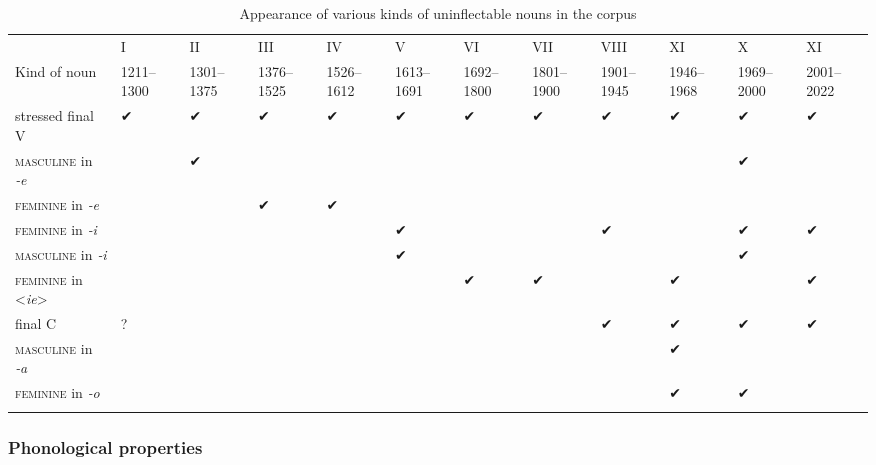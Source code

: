 \documentclass[output=paper,colorlinks,citecolor=brown]{langscibook}
\begin{document}
\begin{table}
	\centering
	\begin{tabularx}{\textwidth}{p{2.7cm}XXXXXXXXXXX}
		\lsptoprule
			\multicolumn{1}{r}{Time period} & I & II & III & IV & V & VI & VII & VIII & XI & X & XI \\
			\multicolumn{1}{l}{Kind of noun} & 1211–1300 & 1301–1375 & 1376–1525 & 1526–1612 & 1613–1691 & 1692–1800 & 1801–1900 & 1901–1945 & 1946–1968 & 1969–2000 & 2001–2022 \\
			\midrule
			stressed final V & ✔ & ✔ & ✔ & ✔ & ✔ & ✔ & ✔ & ✔ & ✔ & ✔ & ✔ \\
			\textsc{masculine} in \emph{‑e} & & ✔ & & & & & & & & ✔ & \\
			\textsc{feminine} in \emph{‑e} & & & ✔ & ✔ & & & & & & & \\
			\textsc{feminine} in \emph{‑i} & \cellcolor{gray!75} & \cellcolor{gray!75} & \cellcolor{gray!75} & \cellcolor{gray!75} & ✔ & & & ✔ & & ✔ & ✔ \\
			\textsc{masculine} in \emph{‑i} & \cellcolor{gray!75} & \cellcolor{gray!75} & \cellcolor{gray!75} & \cellcolor{gray!75} & ✔ & & & & & ✔ & \\
			\textsc{feminine} in <\emph{ie}> & \cellcolor{gray!75} & \cellcolor{gray!75} & \cellcolor{gray!75} & \cellcolor{gray!75} & \cellcolor{gray!75} & ✔ & ✔ & & ✔ & & ✔ \\
			final C & ? & \cellcolor{gray!50} & \cellcolor{gray!50} & \cellcolor{gray!50} & \cellcolor{gray!50} & \cellcolor{gray!50} & \cellcolor{gray!50} & ✔ & ✔ & ✔ & ✔ \\
			\textsc{masculine} in \emph{‑a} & \cellcolor{gray!75} & \cellcolor{gray!75} & \cellcolor{gray!75} & \cellcolor{gray!75} & \cellcolor{gray!75} & \cellcolor{gray!75} & \cellcolor{gray!75} & \cellcolor{gray!75} & ✔ & & \\
			\textsc{feminine} in \emph{‑o} & \cellcolor{gray!75} & \cellcolor{gray!75} & \cellcolor{gray!75} & \cellcolor{gray!75} & \cellcolor{gray!75} & \cellcolor{gray!75} & \cellcolor{gray!75} & \cellcolor{gray!75} & ✔ & ✔ & \\
		\lspbottomrule
	\end{tabularx}
	\caption{Appearance of various kinds of uninflectable nouns in the corpus}
	\label{10tab9}
\end{table}

\subsubsection{Phonological properties} \label{10sec3.2.1}
\end{document}
